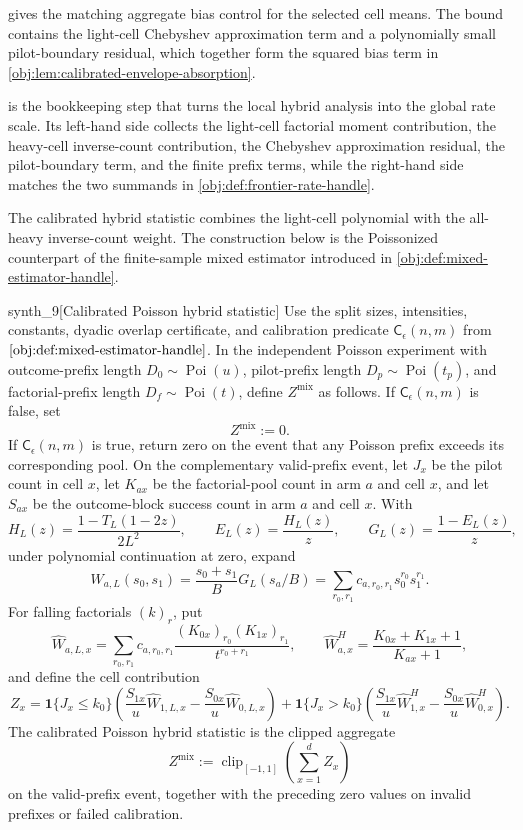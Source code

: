 \documentclass[11pt]{article}
\begin{document}
 gives the matching aggregate bias control for the selected cell means. The bound contains the light-cell Chebyshev approximation term and a polynomially small pilot-boundary residual, which together form the squared bias term in \cref{obj:lem:calibrated-envelope-absorption}.

 is the bookkeeping step that turns the local hybrid analysis into the global rate scale. Its left-hand side collects the light-cell factorial moment contribution, the heavy-cell inverse-count contribution, the Chebyshev approximation residual, the pilot-boundary term, and the finite prefix terms, while the right-hand side matches the two summands in \cref{obj:def:frontier-rate-handle}.

The calibrated hybrid statistic combines the light-cell polynomial with the all-heavy inverse-count weight. The construction below is the Poissonized counterpart of the finite-sample mixed estimator introduced in \cref{obj:def:mixed-estimator-handle}.

\begin{definitionv}{synth_9}[Calibrated Poisson hybrid statistic]
Use the split sizes, intensities, constants, dyadic overlap certificate, and calibration predicate \(\mathsf C_\epsilon(n,m)\) from \(\cref{obj:def:mixed-estimator-handle}\). In the independent Poisson experiment with outcome-prefix length \(D_0\sim\operatorname{Poi}(u)\), pilot-prefix length \(D_p\sim\operatorname{Poi}(t_p)\), and factorial-prefix length \(D_f\sim\operatorname{Poi}(t)\), define \(Z^{\mathrm{mix}}\) as follows. If \(\mathsf C_\epsilon(n,m)\) is false, set
\[
Z^{\mathrm{mix}}:=0 .
\]
If \(\mathsf C_\epsilon(n,m)\) is true, return zero on the event that any Poisson prefix exceeds its corresponding pool. On the complementary valid-prefix event, let \(J_x\) be the pilot count in cell \(x\), let \(K_{ax}\) be the factorial-pool count in arm \(a\) and cell \(x\), and let \(S_{ax}\) be the outcome-block success count in arm \(a\) and cell \(x\). With
\[
H_L(z)=\frac{1-T_L(1-2z)}{2L^2},\qquad
E_L(z)=\frac{H_L(z)}{z},\qquad
G_L(z)=\frac{1-E_L(z)}{z},
\]
under polynomial continuation at zero, expand
\[
W_{a,L}(s_0,s_1)=\frac{s_0+s_1}{B}G_L(s_a/B)
=\sum_{r_0,r_1}c_{a,r_0,r_1}s_0^{r_0}s_1^{r_1}.
\]
For falling factorials \((k)_r\), put
\[
\widehat W_{a,L,x}
=\sum_{r_0,r_1}c_{a,r_0,r_1}
\frac{(K_{0x})_{r_0}(K_{1x})_{r_1}}{t^{r_0+r_1}},
\qquad
\widehat W^H_{a,x}
=\frac{K_{0x}+K_{1x}+1}{K_{ax}+1},
\]
and define the cell contribution
\[
Z_x=
\mathbf1\{J_x\le k_0\}
\left(\frac{S_{1x}}u\widehat W_{1,L,x}
-\frac{S_{0x}}u\widehat W_{0,L,x}\right)
+\mathbf1\{J_x>k_0\}
\left(\frac{S_{1x}}u\widehat W^H_{1,x}
-\frac{S_{0x}}u\widehat W^H_{0,x}\right).
\]
The calibrated Poisson hybrid statistic is the clipped aggregate
\[
Z^{\mathrm{mix}}
:=
\operatorname{clip}_{[-1,1]}\!\left(\sum_{x=1}^d Z_x\right)
\]
on the valid-prefix event, together with the preceding zero values on invalid prefixes or failed calibration.
\end{definitionv}
\end{document}
